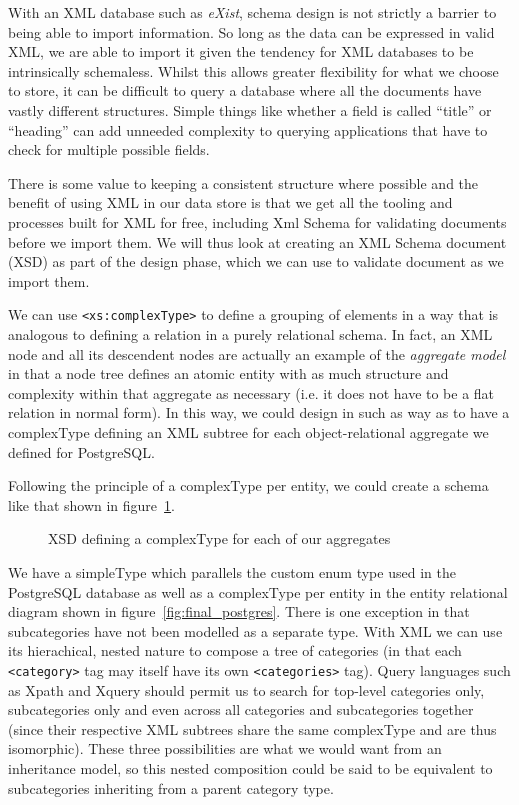 \documentclass[11pt,a4paper]{article}
\begin{document}
With an XML database such as \emph{eXist}, schema design is not strictly
a barrier to being able to import information. So long as the data can
be expressed in valid XML, we are able to import it given the tendency
for XML databases to be intrinsically schemaless. Whilst this allows
greater flexibility for what we choose to store, it can be difficult
to query a database where all the documents have vastly different structures.
Simple things like whether a field is called ``title'' or ``heading''
can add unneeded complexity to querying applications that have to check
for multiple possible fields.

There is some value to keeping a consistent structure where possible
and the benefit of using XML in our data store is that we get all
the tooling and processes built for XML for free, including Xml Schema for
validating documents before we import them. We will thus look at creating
an XML Schema document (XSD) as part of the design phase, which we can
use to validate document as we import them.

We can use \lstinline|<xs:complexType>| to define a grouping of elements
in a way that is analogous to defining a relation in a purely relational
schema. In fact, an XML node and all its descendent nodes are actually an
example of the \emph{aggregate model} in that a node tree defines an
atomic entity with as much structure and complexity within that
aggregate as necessary (i.e. it does not have to be a flat relation in
normal form). In this way, we could design in such as way as to have
a complexType defining an XML subtree for each object-relational aggregate
we defined for PostgreSQL.

Following the principle of a complexType per entity, we could create
a schema like that shown in figure~\ref{fig:xsd}.

\begin{figure}[p]
  
  \caption{XSD defining a complexType for each of our aggregates}
  \label{fig:xsd}
\end{figure}

We have a simpleType which parallels the custom enum type used in the
PostgreSQL database as well as a complexType per entity in the entity
relational diagram shown in figure~\ref{fig:final_postgres}. There is one
exception in that subcategories have not been modelled as a separate
type. With XML we can use its hierachical, nested nature to compose
a tree of categories (in that each \lstinline|<category>| tag may
itself have its own \lstinline|<categories>| tag). Query languages such
as Xpath and Xquery should permit us to search for top-level categories
only, subcategories only and even across all categories and subcategories
together (since their respective XML subtrees share the same complexType and
are thus isomorphic). These three possibilities are what we would want
from an inheritance model, so this nested composition could be said
to be equivalent to subcategories inheriting from a parent category type.
\end{document}
